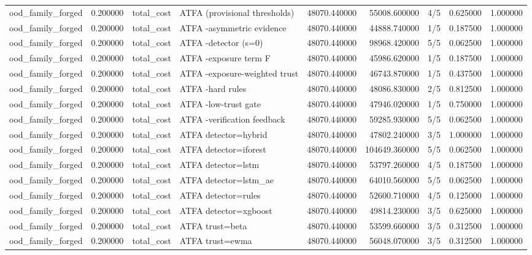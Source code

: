 \begin{tabular}{lrllrrlrr}
ood\_family\_forged & 0.200000 & total\_cost & ATFA (provisional thresholds) & 48070.440000 & 55008.600000 & 4/5 & 0.625000 & 1.000000 \\
ood\_family\_forged & 0.200000 & total\_cost & ATFA -asymmetric evidence & 48070.440000 & 44888.740000 & 1/5 & 0.187500 & 1.000000 \\
ood\_family\_forged & 0.200000 & total\_cost & ATFA -detector (s=0) & 48070.440000 & 98968.420000 & 5/5 & 0.062500 & 1.000000 \\
ood\_family\_forged & 0.200000 & total\_cost & ATFA -exposure term F & 48070.440000 & 45986.620000 & 1/5 & 0.187500 & 1.000000 \\
ood\_family\_forged & 0.200000 & total\_cost & ATFA -exposure-weighted trust & 48070.440000 & 46743.870000 & 1/5 & 0.437500 & 1.000000 \\
ood\_family\_forged & 0.200000 & total\_cost & ATFA -hard rules & 48070.440000 & 48086.830000 & 2/5 & 0.812500 & 1.000000 \\
ood\_family\_forged & 0.200000 & total\_cost & ATFA -low-trust gate & 48070.440000 & 47946.020000 & 1/5 & 0.750000 & 1.000000 \\
ood\_family\_forged & 0.200000 & total\_cost & ATFA -verification feedback & 48070.440000 & 59285.930000 & 5/5 & 0.062500 & 1.000000 \\
ood\_family\_forged & 0.200000 & total\_cost & ATFA detector=hybrid & 48070.440000 & 47802.240000 & 3/5 & 1.000000 & 1.000000 \\
ood\_family\_forged & 0.200000 & total\_cost & ATFA detector=iforest & 48070.440000 & 104649.360000 & 5/5 & 0.062500 & 1.000000 \\
ood\_family\_forged & 0.200000 & total\_cost & ATFA detector=lstm & 48070.440000 & 53797.260000 & 4/5 & 0.187500 & 1.000000 \\
ood\_family\_forged & 0.200000 & total\_cost & ATFA detector=lstm\_ae & 48070.440000 & 64010.560000 & 5/5 & 0.062500 & 1.000000 \\
ood\_family\_forged & 0.200000 & total\_cost & ATFA detector=rules & 48070.440000 & 52600.710000 & 4/5 & 0.125000 & 1.000000 \\
ood\_family\_forged & 0.200000 & total\_cost & ATFA detector=xgboost & 48070.440000 & 49814.230000 & 3/5 & 0.625000 & 1.000000 \\
ood\_family\_forged & 0.200000 & total\_cost & ATFA trust=beta & 48070.440000 & 53599.660000 & 3/5 & 0.312500 & 1.000000 \\
ood\_family\_forged & 0.200000 & total\_cost & ATFA trust=ewma & 48070.440000 & 56048.070000 & 3/5 & 0.312500 & 1.000000 \\

\end{tabular}
